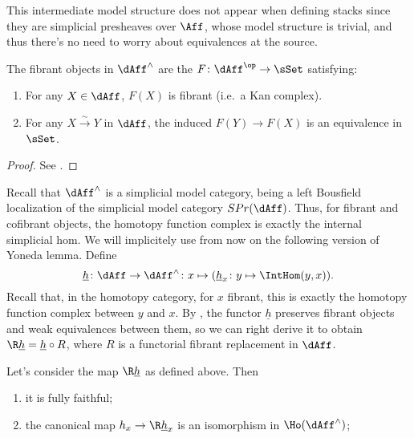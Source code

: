 \begin{description}
            This intermediate model structure does not appear when defining stacks since they are simplicial presheaves over $\Aff$, whose model structure is trivial, and thus there's no need to worry about equivalences at the source. 
            \begin{prop}
                \label{prop:fibrant_objects_prestack}
                The fibrant objects in $\dAff^{\wedge}$ are the $F\colon \dAff^{\op} \to \sSet$ satisfying:
                \begin{enumerate}
                    \item For any $X \in \dAff$, $F(X)$ is fibrant (i.e.\ a Kan complex).
                    \item For any $X \stackrel{\sim}{\to} Y$ in $\dAff$, the induced $F(Y) \to F(X)$ is an equivalence in $\sSet$.
                \end{enumerate}
            \end{prop}
            \begin{proof}
                See \cite[4.1]{ToVe:hag1}.
            \end{proof}
            Recall that $\dAff^{\wedge}$ is a simplicial model category, being a left Bousfield localization of the simplicial model category $SPr(\dAff)$. Thus, for fibrant and cofibrant objects, the homotopy function complex is exactly the internal simplicial hom.
            We will implicitely use from now on the following version of Yoneda lemma. 
            Define 
            \[
                \underline{h}\colon \dAff \to \dAff^{\wedge}\colon x \mapsto (\underline{h}_x\colon y \mapsto \IntHom(y, x)).
            \] 
            Recall that, in the homotopy category, for $x$ fibrant, this is exactly the homotopy function complex between $y$ and $x$. By \cite[Lemma~4.2.1]{ToVe:hag1}, the functor $\underline{h}$ preserves fibrant objects and weak equivalences between them, so we can right derive it to obtain $\R\underline{h} = \underline{h} \circ R$, where $R$ is a functorial fibrant replacement in $\dAff$.
            \begin{prop}
                \label{prop:model_yoneda_lemma}
                Let's consider the map $\R\underline{h}$ as defined above. Then 
                \begin{enumerate}
                    \item it is fully faithful;
                    \item the canonical map $h_x \to \R\underline{h}_x$ is an isomorphism in $\Ho(\dAff^{\wedge})$;

\end{enumerate}
\end{prop}
\end{description}
